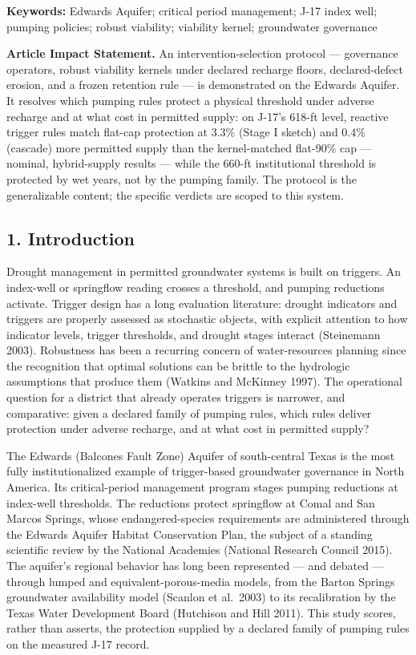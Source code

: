 \documentclass[11pt]{article}
\begin{document}
\textbf{Keywords:} Edwards Aquifer; critical period management; J-17
index well; pumping policies; robust viability; viability kernel;
groundwater governance

\textbf{Article Impact Statement.} An intervention-selection protocol
--- governance operators, robust viability kernels under declared
recharge floors, declared-defect erosion, and a frozen retention rule
--- is demonstrated on the Edwards Aquifer. It resolves which pumping
rules protect a physical threshold under adverse recharge and at what
cost in permitted supply: on J-17's 618-ft level, reactive trigger rules
match flat-cap protection at 3.3\% (Stage I sketch) and 0.4\% (cascade)
more permitted supply than the kernel-matched flat-90\% cap --- nominal,
hybrid-supply results --- while the 660-ft institutional threshold is
protected by wet years, not by the pumping family. The protocol is the
generalizable content; the specific verdicts are scoped to this system.

\subsection{1. Introduction}\label{introduction}

Drought management in permitted groundwater systems is built on
triggers. An index-well or springflow reading crosses a threshold, and
pumping reductions activate. Trigger design has a long evaluation
literature: drought indicators and triggers are properly assessed as
stochastic objects, with explicit attention to how indicator levels,
trigger thresholds, and drought stages interact (Steinemann 2003).
Robustness has been a recurring concern of water-resources planning
since the recognition that optimal solutions can be brittle to the
hydrologic assumptions that produce them (Watkins and McKinney 1997).
The operational question for a district that already operates triggers
is narrower, and comparative: given a declared family of pumping rules,
which rules deliver protection under adverse recharge, and at what cost
in permitted supply?

The Edwards (Balcones Fault Zone) Aquifer of south-central Texas is the
most fully institutionalized example of trigger-based groundwater
governance in North America. Its critical-period management program
stages pumping reductions at index-well thresholds. The reductions
protect springflow at Comal and San Marcos Springs, whose
endangered-species requirements are administered through the Edwards
Aquifer Habitat Conservation Plan, the subject of a standing scientific
review by the National Academies (National Research Council 2015). The
aquifer's regional behavior has long been represented --- and debated
--- through lumped and equivalent-porous-media models, from the Barton
Springs groundwater availability model (Scanlon et al.~2003) to its
recalibration by the Texas Water Development Board (Hutchison and Hill
2011). This study scores, rather than asserts, the protection supplied
by a declared family of pumping rules on the measured J-17 record.
\end{document}
